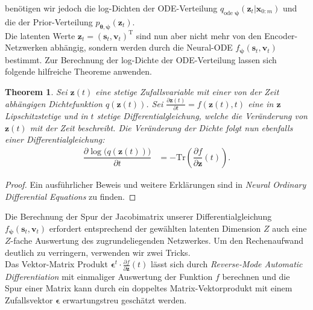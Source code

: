 \documentclass[12pt]{article}
\newtheorem{theorem}{Theorem}
\begin{document}
	benötigen wir jedoch die log-Dichten der ODE-Verteilung $q_{\text{ode }\boldsymbol\psi}(\mathbf{z}_{t}|\mathbf{x}_{0:m})$ und die der Prior-Verteilung $p_{\boldsymbol\theta,\boldsymbol\psi}(\mathbf{z}_{t})$.\\
	Die latenten Werte $\mathbf{z}_{t} = (\mathbf{s}_{t},\mathbf{v}_{t})^{\mathrm{T}}$ sind nun aber nicht mehr von den Encoder-Netzwerken abhängig, sondern werden durch die Neural-ODE $f_{\boldsymbol\psi}(\mathbf{s}_{t},\mathbf{v}_{t})$ bestimmt.
	Zur Berechnung der log-Dichte der ODE-Verteilung lassen sich folgende hilfreiche Theoreme anwenden.
	\begin{theorem}
	Sei $\mathbf{z}(t)$ eine stetige Zufallsvariable mit einer von der Zeit abhängigen Dichtefunktion $q(\mathbf{z}(t))$. Sei $\tfrac{\partial \mathbf{z}(t)}{\partial t}=f(\mathbf{z}(t),t)$ eine in $\mathbf{z}$ Lipschitzstetige und in $t$ stetige Differentialgleichung, welche die Veränderung von $\mathbf{z}(t)$ mit der Zeit beschreibt.
	Die Veränderung der Dichte folgt nun ebenfalls einer Differentialgleichung:
	\begin{align*}
	\dfrac{\partial \log\big(q(\mathbf{z}(t))\big)}{\partial t}&= - \mathrm{Tr}\left(\dfrac{\partial f}{\partial\mathbf{z}}(t)\right).
	\end{align*}
	\end{theorem}
	\begin{proof}
	Ein ausführlicher Beweis und weitere Erklärungen sind  in \emph{Neural Ordinary Differential Equations} \cite{neuralode} zu finden.
	\end{proof}
	Die Berechnung der Spur der Jacobimatrix unserer Differentialgleichung $f_{\boldsymbol\psi}(\mathbf{s}_{t},\mathbf{v}_{t})$ erfordert entsprechend der gewählten latenten Dimension $Z$ auch eine $Z$-fache Auswertung des zugrundeliegenden Netzwerkes. Um den Rechenaufwand deutlich zu verringern, verwenden wir zwei Tricks.\cite{ffjord}\\
	Das Vektor-Matrix Produkt $\boldsymbol\epsilon^t \cdot \tfrac{\partial f}{\partial\mathbf{z}}(t)$ lässt sich durch \emph{Reverse-Mode Automatic Differentiation} mit einmaliger Auswertung der Funktion $f$ berechnen und die Spur einer Matrix kann durch ein doppeltes Matrix-Vektorprodukt mit einem Zufallsvektor $\boldsymbol\epsilon$ erwartungstreu geschätzt werden.
\end{document}
